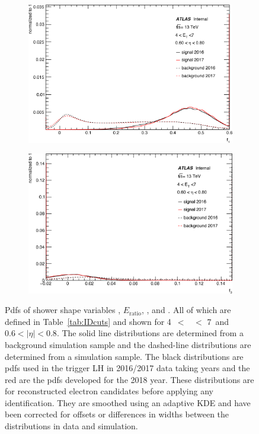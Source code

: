 \begin{figure}[t]
\begin{subfigure}[b]{0.49\textwidth}
    \includegraphics[width=1.0\textwidth]{figs/egamma/trig_f1_lowet.png} 
    \label{fig:egamma:trig_f1_lowet}
  \end{subfigure}
  \hfill
  \begin{subfigure}[b]{0.49\textwidth}
    \centering
    \includegraphics[width=1.0\textwidth]{figs/egamma/trig_f3_lowet.png} 
    \label{fig:egamma:trig_f3_lowet}
  \end{subfigure}
  \caption[Pdfs of shower shape variables \rphi, $E_{\mathrm{ratio}}$, \fI, and \fIII]{Pdfs of shower shape variables \rphi, $E_{\mathrm{ratio}}$, \fI, and \fIII.
  All of which are defined in Table~\ref{tab:IDcuts} and shown for
  4~\GeV $<$ \et\ $<$ 7~\GeV and $0.6<|\eta|<0.8$.
  The solid line distributions are determined from a background simulation sample and the dashed-line distributions are determined from a \Zee simulation sample.
  The black distributions are pdfs used in the trigger LH in 2016/2017 data taking years and the red are the pdfs developed for the 2018 year.
  These distributions are for reconstructed electron candidates before applying any identification.
  They are smoothed using an adaptive KDE and have been corrected for offsets or differences in widths between the distributions in data and simulation.
}
\label{fig:egamma:trig_pdfs_lowet}
\end{figure}

